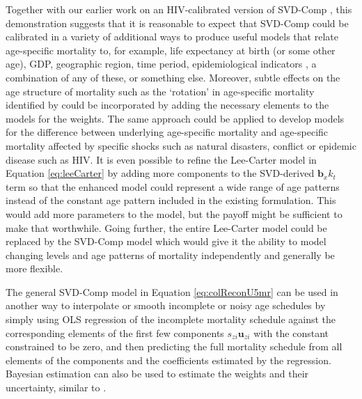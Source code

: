 \documentclass[11pt]{article}
\newcommand{\mbf}{\mathbf}
\begin{document}
Together with our earlier work on an HIV-calibrated version of SVD-Comp  \citep{sharrow2014modeling}, this demonstration suggests that it is reasonable to expect that SVD-Comp could be calibrated in a variety of additional ways to produce useful models that relate age-specific mortality to, for example, life expectancy at birth (or some other age), GDP, geographic region, time period, epidemiological indicators \citep[as in ][]{sharrow2014modeling}, a combination of any of these, or something else.  Moreover, subtle effects on the age structure of mortality such as the `rotation' in age-specific mortality identified by \cite{li2011} could be incorporated by adding the necessary elements to the models for the weights.  The same approach could be applied to develop models for the difference between underlying age-specific mortality and age-specific mortality affected by specific shocks such as natural disasters, conflict or epidemic disease such as HIV.  It is even possible to refine the Lee-Carter model in Equation \ref{eq:leeCarter} by adding more components to the SVD-derived $\mbf{b}_xk_t$ term so that the enhanced model could represent a wide range of age patterns instead of the constant age pattern included in the existing formulation.  This would add more parameters to the model, but the payoff might be sufficient to make that worthwhile.  Going further, the entire Lee-Carter model could be replaced by the SVD-Comp model which would give it the ability to model changing levels and age patterns of mortality independently and generally be more flexible.

The general SVD-Comp model in Equation \ref{eq:colReconU5mr} can be used in another way to interpolate or smooth incomplete or noisy age schedules by simply using OLS regression of the incomplete mortality schedule against the corresponding elements of the first few components $s_{zi}\mbf{u}_{zi}$ with the constant constrained to be zero, and then predicting the full mortality schedule from all elements of the components and the coefficients estimated by the regression.   Bayesian estimation can also be used to estimate the weights and their uncertainty, similar to \cite{Sharrow_29_39}.
\end{document}
